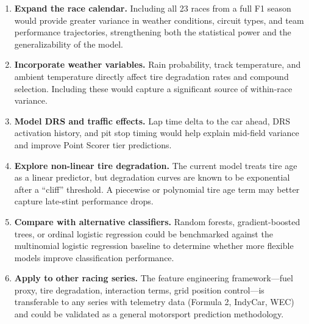 \begin{enumerate}
  \item \textbf{Expand the race calendar.} Including all 23 races from a
    full F1 season would provide greater variance in weather conditions,
    circuit types, and team performance trajectories, strengthening both the
    statistical power and the generalizability of the model.

  \item \textbf{Incorporate weather variables.} Rain probability, track
    temperature, and ambient temperature directly affect tire degradation
    rates and compound selection. Including these would capture a significant
    source of within-race variance.

  \item \textbf{Model DRS and traffic effects.} Lap time delta to the car
    ahead, DRS activation history, and pit stop timing would help explain
    mid-field variance and improve Point Scorer tier predictions.

  \item \textbf{Explore non-linear tire degradation.} The current model
    treats tire age as a linear predictor, but degradation curves are known
    to be exponential after a ``cliff'' threshold. A piecewise or
    polynomial tire age term may better capture late-stint performance
    drops.

  \item \textbf{Compare with alternative classifiers.} Random forests,
    gradient-boosted trees, or ordinal logistic regression could be
    benchmarked against the multinomial logistic regression baseline to
    determine whether more flexible models improve classification
    performance.

  \item \textbf{Apply to other racing series.} The feature engineering
    framework---fuel proxy, tire degradation, interaction terms, grid
    position control---is transferable to any series with telemetry data
    (Formula 2, IndyCar, WEC) and could be validated as a general
    motorsport prediction methodology.
\end{enumerate}

